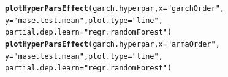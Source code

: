 \documentclass[12pt]{article}\usepackage[]{graphicx}\usepackage[]{color}
\makeatletter
\newcommand{\hlstr}[1]{\textcolor[rgb]{0.192,0.494,0.8}{#1}}%
\newcommand{\hlstd}[1]{\textcolor[rgb]{0.345,0.345,0.345}{#1}}%
\newcommand{\hlkwc}[1]{\textcolor[rgb]{0.333,0.667,0.333}{#1}}%
\newcommand{\hlkwd}[1]{\textcolor[rgb]{0.737,0.353,0.396}{\textbf{#1}}}%
\newenvironment{kframe}{%
 \def\at@end@of@kframe{}%
 \ifinner\ifhmode%
  \def\at@end@of@kframe{\end{minipage}}%
  \begin{minipage}{\columnwidth}%
 \fi\fi%
 \def\FrameCommand##1{\hskip\@totalleftmargin \hskip-\fboxsep
 \colorbox{shadecolor}{##1}\hskip-\fboxsep
     \hskip-\linewidth \hskip-\@totalleftmargin \hskip\columnwidth}%
 \MakeFramed {\advance\hsize-\width
   \@totalleftmargin\z@ \linewidth\hsize
   \@setminipage}}%
 {\par\unskip\endMakeFramed%
 \at@end@of@kframe}
\newenvironment{knitrout}{}{} %
\theoremstyle{definition}
\makeatother
\begin{document}
\begin{knitrout}
\color{fgcolor}\begin{kframe}
\begin{alltt}
\hlkwd{plotHyperParsEffect}\hlstd{(garch.hyperpar,} \hlkwc{x}\hlstd{=} \hlstr{"garchOrder"}\hlstd{,}
                    \hlkwc{y} \hlstd{=} \hlstr{"mase.test.mean"}\hlstd{,} \hlkwc{plot.type} \hlstd{=} \hlstr{"line"}\hlstd{,}
                     \hlkwc{partial.dep.learn} \hlstd{=} \hlstr{"regr.randomForest"}\hlstd{)}
\hlkwd{plotHyperParsEffect}\hlstd{(garch.hyperpar,} \hlkwc{x}\hlstd{=} \hlstr{"armaOrder"}\hlstd{,}
                    \hlkwc{y} \hlstd{=} \hlstr{"mase.test.mean"}\hlstd{,} \hlkwc{plot.type} \hlstd{=} \hlstr{"line"}\hlstd{,}
                     \hlkwc{partial.dep.learn} \hlstd{=} \hlstr{"regr.randomForest"}\hlstd{)}
\end{alltt}
\end{kframe}
\end{knitrout}
\end{document}
